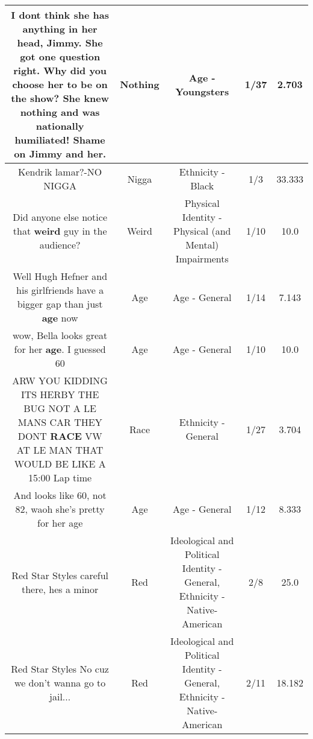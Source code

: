 \documentclass[11pt]{article}
\newlength\mylength
\begin{document}
\begin{center}
\begin{longtable}{|C{.65\mylength}|C{.30\mylength}|C{.12\mylength}|C{.12\mylength}|C{.12\mylength}|}
  \small I dont think she has anything in her head, Jimmy. She got one question right. Why did you choose her to be on the show? She knew \textbf{nothing} and was nationally humiliated! Shame on Jimmy and her.\normalsize   & Nothing & Age - Youngsters & 1/37 & 2.703 \\  \hline
  \small Kendrik lamar?-NO NIGGA\normalsize   & Nigga & Ethnicity - Black & 1/3 & 33.333 \\  \hline
  \small Did anyone else notice that \textbf{weird} guy in the audience?\normalsize   & Weird & Physical Identity - Physical (and Mental) Impairments & 1/10 & 10.0 \\  \hline
  \small Well Hugh Hefner and his girlfriends have a bigger gap than just \textbf{age} now\normalsize   & Age & Age - General & 1/14 & 7.143 \\  \hline
  \small wow, Bella looks great for her \textbf{age}. I guessed 60\normalsize   & Age & Age - General & 1/10 & 10.0 \\  \hline
  \small ARW YOU KIDDING ITS HERBY THE BUG NOT A LE MANS CAR THEY DONT \textbf{RACE} VW AT LE MAN THAT WOULD BE LIKE A 15:00 Lap time\normalsize   & Race & Ethnicity - General & 1/27 & 3.704 \\  \hline
  \small And looks like 60, not 82, waoh she's pretty for her age\normalsize   & Age & Age - General & 1/12 & 8.333 \\  \hline
  \small Red Star Styles careful there, hes a minor\normalsize   & Red &  Ideological and Political Identity - General, Ethnicity - Native-American & 2/8 & 25.0 \\  \hline
  \small Red Star Styles No cuz we don't wanna go to jail...\normalsize   & Red &  Ideological and Political Identity - General, Ethnicity - Native-American & 2/11 & 18.182 \\  \hline

\end{longtable}
\end{center}
\end{document}
